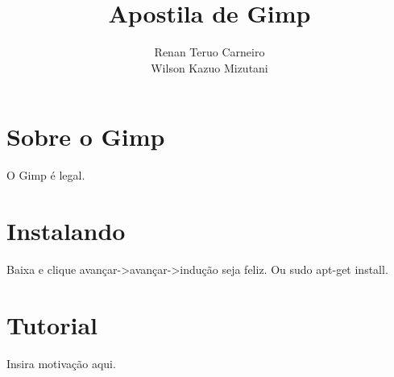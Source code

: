 \documentclass[12pt,onecolumn]{article}
\begin{document}
\title{Apostila de Gimp}
\author{Renan Teruo Carneiro \\ Wilson Kazuo Mizutani}
\maketitle

\section{Sobre o Gimp}
  O Gimp é legal.

\section{Instalando}
  Baixa e clique avançar->avançar->indução seja feliz.
  Ou sudo apt-get install.

\section{Tutorial}
  Insira motivação aqui.
\end{document}
